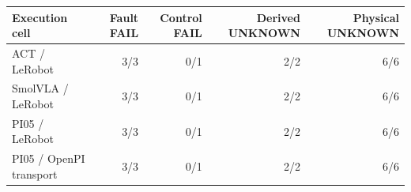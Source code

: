 \begin{tabular}{lrrrr}
\toprule
Execution cell & Fault FAIL & Control FAIL & Derived UNKNOWN & Physical UNKNOWN \\
\midrule
ACT / LeRobot & 3/3 & 0/1 & 2/2 & 6/6 \\
SmolVLA / LeRobot & 3/3 & 0/1 & 2/2 & 6/6 \\
PI05 / LeRobot & 3/3 & 0/1 & 2/2 & 6/6 \\
PI05 / OpenPI transport & 3/3 & 0/1 & 2/2 & 6/6 \\
\bottomrule
\end{tabular}
